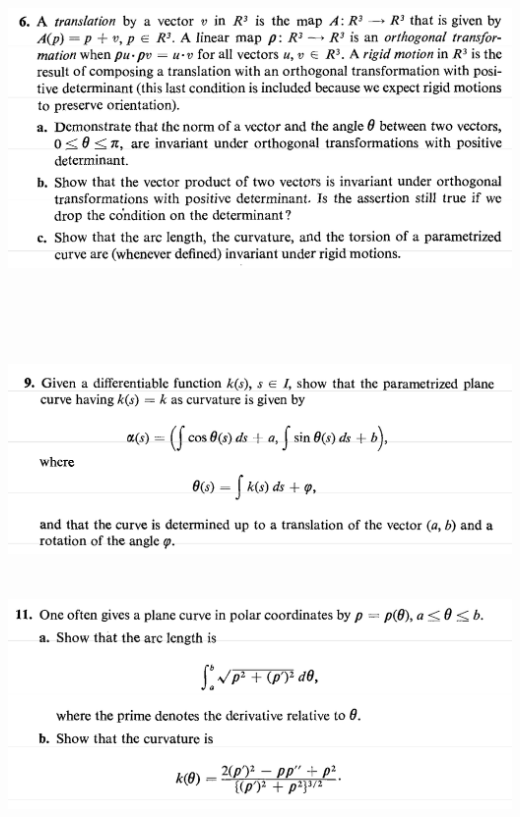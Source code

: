 \documentclass{report}
\begin{document}
\begin{question}{}{}
\includegraphics[height=10cm,width=18cm]{hw2q1}
\end{question}

\begin{question}{}{}
\includegraphics[height=6cm,width=18cm]{hw2q18}
\end{question}
\begin{question}{}{}
\includegraphics[height=6cm,width=18cm]{hw2q17}
\end{question}
\end{document}
